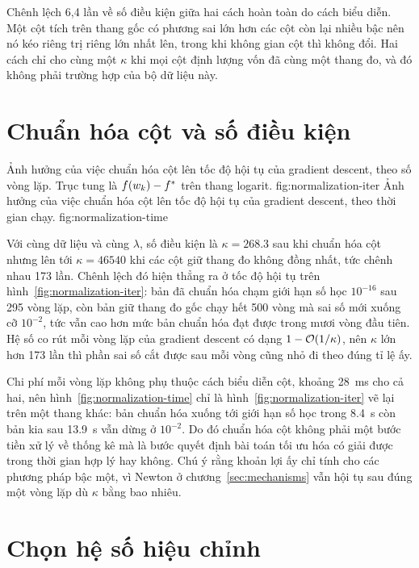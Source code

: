 Chênh lệch 6{,}4 lần về số điều kiện giữa hai cách hoàn toàn do cách biểu diễn.
Một cột tích trên thang gốc có phương sai lớn hơn các cột còn lại nhiều bậc nên
nó kéo riêng trị riêng lớn nhất lên, trong khi không gian cột thì không đổi.
Hai cách chỉ cho cùng một $\kappa$ khi mọi cột định lượng vốn đã cùng một thang
đo, và đó không phải trường hợp của bộ dữ liệu này.

\section{Chuẩn hóa cột và số điều kiện}
\label{sec:normalization}

  {Ảnh hưởng của việc chuẩn hóa cột lên tốc độ hội tụ của gradient descent, theo
   số vòng lặp. Trục tung là $f(w_k) - f^{*}$ trên thang logarit.}
  {fig:normalization-iter}
  {Ảnh hưởng của việc chuẩn hóa cột lên tốc độ hội tụ của gradient descent, theo
   thời gian chạy.}
  {fig:normalization-time}

Với cùng dữ liệu và cùng $\lambda$, số điều kiện là $\kappa = \num{268.3}$ sau
khi chuẩn hóa cột nhưng lên tới $\kappa = \num{46540}$ khi các cột giữ thang đo
không đồng nhất, tức chênh nhau 173 lần. Chênh lệch đó hiện thẳng ra ở tốc độ
hội tụ trên hình~\ref{fig:normalization-iter}: bản đã chuẩn hóa chạm giới hạn
số học $10^{-16}$ sau 295 vòng lặp, còn bản giữ thang đo gốc chạy hết
500 vòng mà sai số mới xuống cỡ $10^{-2}$, tức vẫn cao hơn mức bản chuẩn hóa
đạt được trong mươi vòng đầu tiên. Hệ số co rút mỗi vòng lặp của gradient
descent có dạng $1 - \mathcal{O}(1/\kappa)$, nên $\kappa$ lớn hơn 173 lần thì phần
sai số cắt được sau mỗi vòng cũng nhỏ đi theo đúng tỉ lệ ấy.

Chi phí mỗi vòng lặp không phụ thuộc cách biểu diễn cột, khoảng
\SI{28}{\milli\second} cho cả hai, nên hình~\ref{fig:normalization-time} chỉ là
hình~\ref{fig:normalization-iter} vẽ lại trên một thang khác: bản chuẩn hóa
xuống tới giới hạn số học trong \SI{8.4}{\second} còn bản kia sau
\SI{13.9}{\second} vẫn dừng ở $10^{-2}$. Do đó chuẩn hóa cột không phải một bước
tiền xử lý về thống kê mà là bước quyết định bài toán tối ưu hóa có giải được
trong thời gian hợp lý hay không. Chú ý rằng khoản lợi ấy chỉ tính cho các
phương pháp bậc một, vì
Newton ở chương~\ref{sec:mechanisms} vẫn hội tụ sau đúng một vòng lặp dù
$\kappa$ bằng bao nhiêu.

\section{Chọn hệ số hiệu chỉnh}
\label{sec:choose-lambda}

